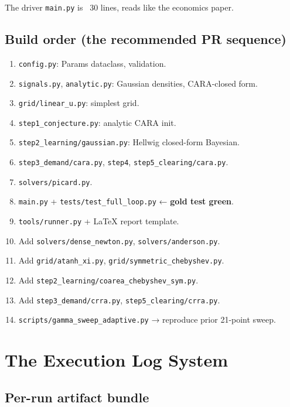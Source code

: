 \documentclass[11pt,oneside]{book}
\theoremstyle{definition}
\begin{document}
\begin{tcolorbox}[title=\textbf{CRRA market-clearing bisection (matches \texttt{crra\_clear\_nb} in MIZN)},
                    colback=gray!5, colframe=black]
\begin{tcolorbox}[title=\textbf{Coefficients $\leftrightarrow$ values at
Lobatto nodes}, colback=gray!5, colframe=black]
\begin{tcolorbox}[title=\textbf{Dense Newton (MIZN \texttt{solvers/dense\_newton.py})},
                    colback=gray!5, colframe=black]
The driver \texttt{main.py} is ~30 lines, reads like the economics paper.

\section{Build order (the recommended PR sequence)}

\begin{enumerate}
\item \texttt{config.py}: Params dataclass, validation.
\item \texttt{signals.py}, \texttt{analytic.py}: Gaussian densities, CARA-closed form.
\item \texttt{grid/linear\_u.py}: simplest grid.
\item \texttt{step1\_conjecture.py}: analytic CARA init.
\item \texttt{step2\_learning/gaussian.py}: Hellwig closed-form Bayesian.
\item \texttt{step3\_demand/cara.py}, \texttt{step4}, \texttt{step5\_clearing/cara.py}.
\item \texttt{solvers/picard.py}.
\item \texttt{main.py} + \texttt{tests/test\_full\_loop.py} ← \textbf{gold test green}.
\item \texttt{tools/runner.py} + LaTeX report template.
\item Add \texttt{solvers/dense\_newton.py}, \texttt{solvers/anderson.py}.
\item Add \texttt{grid/atanh\_xi.py}, \texttt{grid/symmetric\_chebyshev.py}.
\item Add \texttt{step2\_learning/coarea\_chebyshev\_sym.py}.
\item Add \texttt{step3\_demand/crra.py}, \texttt{step5\_clearing/crra.py}.
\item \texttt{scripts/gamma\_sweep\_adaptive.py} → reproduce prior 21-point sweep.
\end{enumerate}

\chapter{The Execution Log System}

\section{Per-run artifact bundle}


\end{tcolorbox}
\end{tcolorbox}
\end{tcolorbox}
\end{document}
